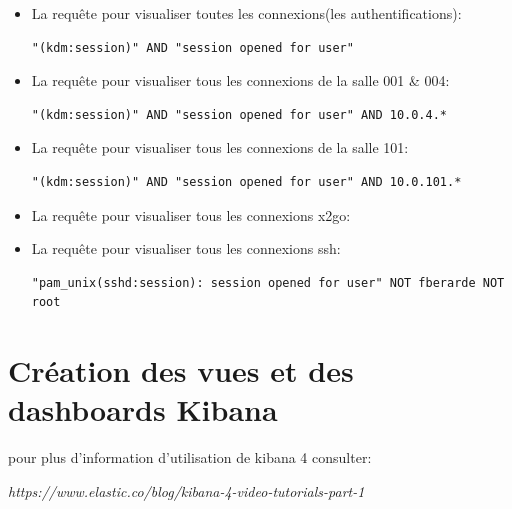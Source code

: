 \documentclass[11pt,a4paper]{article}
\begin{document}
\begin{itemize}
 \item La requête pour visualiser toutes les connexions(les authentifications):

\begin{verbatim}
"(kdm:session)" AND "session opened for user"
\end{verbatim}
\item La requête pour visualiser tous les connexions de la salle 001 \& 004:

\begin{verbatim}
"(kdm:session)" AND "session opened for user" AND 10.0.4.*
\end{verbatim}

\item La requête pour visualiser tous les connexions de la salle 101:

\begin{verbatim}
"(kdm:session)" AND "session opened for user" AND 10.0.101.*
\end{verbatim}

\item La requête pour visualiser tous les connexions x2go:


\item La requête pour visualiser tous les connexions ssh:

\begin{verbatim}
"pam_unix(sshd:session): session opened for user" NOT fberarde NOT root
\end{verbatim}

\end{itemize}
\section{Création des vues et des dashboards Kibana} 
pour plus d'information d'utilisation de kibana 4 consulter: 

\textit{https://www.elastic.co/blog/kibana-4-video-tutorials-part-1}
\end{document}
